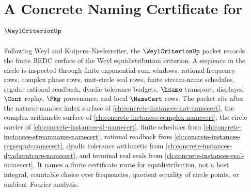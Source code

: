\chapter{A Concrete Naming Certificate for $\WeylCriterionUp$}
\label{ch:concrete-instances-weyl-criterion-namecert}

Following Weyl and Kuipers--Niederreiter, the $\WeylCriterionUp$ packet records the finite BEDC surface of the Weyl equidistribution criterion. A sequence in the circle is inspected through finite exponential-sum windows: rational frequency rows, complex phase rows, unit-circle seal rows, finite stream-name schedules, regular rational readback, dyadic tolerance budgets, $\hsame$ transport, displayed $\Cont$ replay, $\Pkg$ provenance, and local $\NameCert$ rows. The packet sits after the natural-number index surface of \autoref{ch:concrete-instances-nat-namecert}, the complex arithmetic surface of \autoref{ch:concrete-instances-complex-namecert}, the circle carrier of \autoref{ch:concrete-instances-s1-namecert}, finite schedules from \autoref{ch:concrete-instances-streamname-namecert}, rational readback from \autoref{ch:concrete-instances-regseqrat-namecert}, dyadic tolerance arithmetic from \autoref{ch:concrete-instances-dyadicratcore-namecert}, and terminal real seals from \autoref{ch:concrete-instances-real-namecert}. It names a finite certificate route for equidistribution, not a host integral, countable choice over frequencies, quotient equality of circle points, or ambient Fourier analysis.

